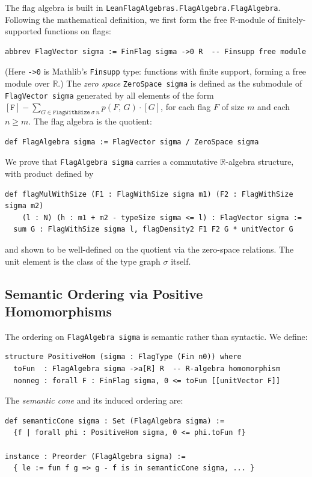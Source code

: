 \documentclass{article}
\newcommand{\den}[2]{p(#1,\,#2)}
\newcommand{\lean}[1]{\texttt{#1}}
\begin{document}
The flag algebra is built in
\lean{LeanFlagAlgebras.FlagAlgebra.FlagAlgebra}.
Following the mathematical definition, we first form the free
$\mathbb{R}$-module of finitely-supported functions on flags:
\begin{lstlisting}
abbrev FlagVector sigma := FinFlag sigma ->0 R  -- Finsupp free module
\end{lstlisting}
(Here \lean{->0} is Mathlib's \lean{Finsupp} type: functions with finite
support, forming a free module over $\mathbb{R}$.)
The \emph{zero space} \lean{ZeroSpace sigma} is defined as the submodule of
\lean{FlagVector sigma} generated by all elements of the form
$[\lean{F}] - \sum_{G \in \lean{FlagWithSize}\ \sigma\ n} \den{F}{G} \cdot [G]$,
for each flag $F$ of size $m$ and each $n \geq m$.
The flag algebra is the quotient:
\begin{lstlisting}
def FlagAlgebra sigma := FlagVector sigma / ZeroSpace sigma
\end{lstlisting}
We prove that \lean{FlagAlgebra sigma} carries a commutative $\mathbb{R}$-algebra
structure, with product defined by
\begin{lstlisting}
def flagMulWithSize (F1 : FlagWithSize sigma m1) (F2 : FlagWithSize sigma m2)
    (l : N) (h : m1 + m2 - typeSize sigma <= l) : FlagVector sigma :=
  sum G : FlagWithSize sigma l, flagDensity2 F1 F2 G * unitVector G
\end{lstlisting}
and shown to be well-defined on the quotient via the zero-space relations.
The unit element is the class of the type graph $\sigma$ itself.

\subsection{Semantic Ordering via Positive Homomorphisms}

The ordering on \lean{FlagAlgebra sigma} is semantic rather than syntactic.
We define:
\begin{lstlisting}
structure PositiveHom (sigma : FlagType (Fin n0)) where
  toFun  : FlagAlgebra sigma ->a[R] R  -- R-algebra homomorphism
  nonneg : forall F : FinFlag sigma, 0 <= toFun [[unitVector F]]
\end{lstlisting}
The \emph{semantic cone} and its induced ordering are:
\begin{lstlisting}
def semanticCone sigma : Set (FlagAlgebra sigma) :=
  {f | forall phi : PositiveHom sigma, 0 <= phi.toFun f}

instance : Preorder (FlagAlgebra sigma) :=
  { le := fun f g => g - f is in semanticCone sigma, ... }
\end{lstlisting}
\end{document}
